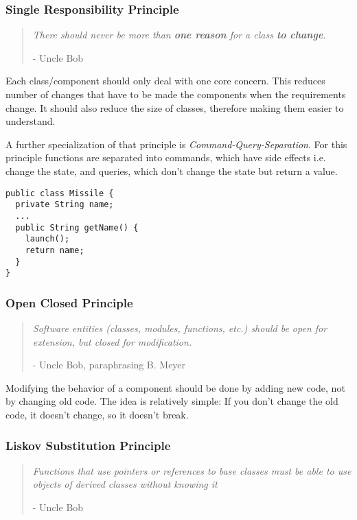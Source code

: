 \subsubsection{Single Responsibility Principle}

\begin{quote}
  \textit{There should never be more than \textbf{one reason} for a class \textbf{to change}.}

  - Uncle Bob
\end{quote}

Each class/component should only deal with one core concern.
%
This reduces number of changes that have to be made the components when the requirements change. 
%
It should also reduce the size of classes, therefore making them easier to understand.
%

%
A further specialization of that principle is \emph{Command-Query-Separation}.
%
For this principle functions are separated into commands, which have side effects i.e. change the
state, and queries, which don't change the state but return a value.

\begin{verbatim}
public class Missile {
  private String name;
  ...
  public String getName() {
    launch();
    return name;
  }
}
\end{verbatim}


\subsubsection{Open Closed Principle}

\begin{quote}
  \textit{Software entities (classes, modules, functions, etc.) should be open for extension, but
  closed for modification.}

  - Uncle Bob, paraphrasing B. Meyer
\end{quote}

Modifying the behavior of a component should be done by adding new code, not by changing old code.
%
The idea is relatively simple: If you don't change the old code, it doesn't change, so it doesn't
break.
%


\subsubsection{Liskov Substitution Principle}

\begin{quote}
  \textit{Functions that use pointers or references to base classes must be able to use objects of
  derived classes without knowing it}

  - Uncle Bob
\end{quote}

